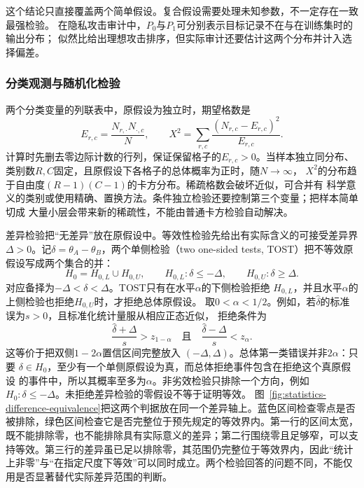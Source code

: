 这个结论只直接覆盖两个简单假设。复合假设需要处理未知参数，不一定存在一致最强检验。
在隐私攻击审计中，\(P_0\)与\(P_1\)可分别表示目标记录不在与在训练集时的输出分布；
似然比给出理想攻击排序，但实际审计还要估计这两个分布并计入选择偏差。

\subsubsection{分类观测与随机化检验}
两个分类变量的列联表中，原假设为独立时，期望格数是
\[
  E_{r,c}=\frac{N_{r,\cdot}N_{\cdot,c}}{N},\qquad
  X^2=\sum_{r,c}\frac{(N_{r,c}-E_{r,c})^2}{E_{r,c}}.
\]
计算时先删去零边际计数的行列，保证保留格子的\(E_{r,c}>0\)。当样本独立同分布、类别数\(R,C\)固定，且原假设下各格子的总体概率为正时，随\(N\to\infty\)，
\(X^2\)的分布趋于自由度\((R-1)(C-1)\)的卡方分布。稀疏格数会破坏近似，可合并有
科学意义的类别或使用精确、置换方法。条件独立检验还要控制第三个变量；把样本简单切成
大量小层会带来新的稀疏性，不能由普通卡方检验自动解决。

差异检验把“无差异”放在原假设中。等效性检验先给出有实际含义的可接受差异界
\(\Delta>0\)。记\(\delta=\theta_A-\theta_B\)，两个单侧检验（two one-sided
tests, TOST）把不等效原假设写成两个集合的并：
\[
  H_0=H_{0,L}\cup H_{0,U},
  \qquad
  H_{0,L}:\delta\leq-\Delta,
  \qquad
  H_{0,U}:\delta\geq\Delta.
\]
对应备择为\(-\Delta<\delta<\Delta\)。TOST只有在水平\(\alpha\)的下侧检验拒绝
\(H_{0,L}\)，并且水平\(\alpha\)的上侧检验也拒绝\(H_{0,U}\)时，才拒绝总体原假设。
取\(0<\alpha<1/2\)。例如，若\(\widehat\delta\)的标准误为\(s>0\)，且标准化统计量服从相应正态近似，
拒绝条件为
\begin{equation}
  \frac{\widehat\delta+\Delta}{s}>z_{1-\alpha}
  \quad\text{且}\quad
  \frac{\widehat\delta-\Delta}{s}<z_{\alpha}.
  \label{eq:statistics-tost-rejection}
\end{equation}
这等价于把双侧\(1-2\alpha\)置信区间完整放入
\((-\Delta,\Delta)\)。总体第一类错误并非\(2\alpha\)：只要
\(\delta\in H_0\)，至少有一个单侧原假设为真，而总体拒绝事件包含在拒绝这个真原假设
的事件中，所以其概率至多为\(\alpha\)。非劣效检验只排除一个方向，例如
\(H_0:\delta\leq-\Delta\)。未拒绝差异检验的零假设不等于证明等效。
图~\ref{fig:statistics-difference-equivalence}把这两个判据放在同一个差异轴上。蓝色区间检查零点是否被排除，绿色区间检查它是否完整位于预先规定的等效界内。第一行的区间太宽，既不能排除零，也不能排除具有实际意义的差异；第二行围绕零且足够窄，可以支持等效。第三行的差异虽已足以排除零，其范围仍完整位于等效界内，因此“统计上非零”与“在指定尺度下等效”可以同时成立。两个检验回答的问题不同，不能仅用是否显著替代实际差异范围的判断。


